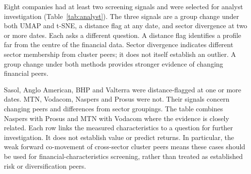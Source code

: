 Eight companies had at least two screening signals and were selected for analyst investigation (Table~\ref{tab:analyst}). The three signals are a group change under both UMAP and t-SNE, a distance flag at any date, and sector divergence at two or more dates. Each asks a different question. A distance flag identifies a profile far from the centre of the financial data. Sector divergence indicates different sector membership from cluster peers; it does not itself establish an outlier. A group change under both methods provides stronger evidence of changing financial peers.

Sasol, Anglo American, BHP and Valterra were distance-flagged at one or more dates. MTN, Vodacom, Naspers and Prosus were not. Their signals concern changing peers and differences from sector groupings. The table combines Naspers with Prosus and MTN with Vodacom where the evidence is closely related. Each row links the measured characteristics to a question for further investigation. It does not establish value or predict returns. In particular, the weak forward co-movement of cross-sector cluster peers means these cases should be used for financial-characteristics screening, rather than treated as established risk or diversification peers.

